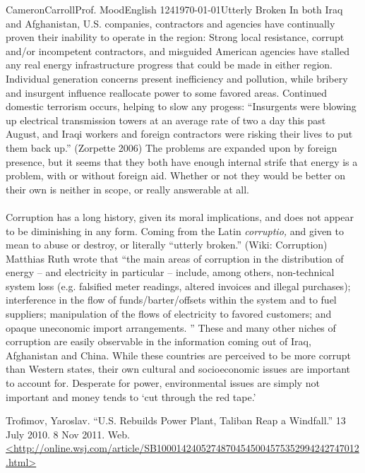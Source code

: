 \begin{mla}{Cameron}{Carroll}{Prof. Mood}{English 124}{\today}{Utterly Broken}
In both Iraq and Afghanistan, U.S. companies, contractors and agencies have continually proven their inability to operate in the region: Strong local resistance, corrupt and/or incompetent contractors, and misguided American agencies have stalled any real energy infrastructure progress that could be made in either region. Individual generation concerns present inefficiency and pollution, while bribery and insurgent influence reallocate power to some favored areas. Continued domestic terrorism occurs, helping to slow any progess: ``Insurgents were blowing up electrical transmission towers at an average rate of two a day this past August, and Iraqi workers and foreign contractors were risking their lives to put them back up.'' (Zorpette 2006) The problems are expanded upon by foreign presence, but it seems that they both have enough internal strife that energy is a problem, with or without foreign aid. Whether or not they would be better on their own is neither in scope, or really answerable at all.

\paragraph{} 
Corruption has a long history, given its moral implications, and does not appear to be diminishing in any form. Coming from the Latin \emph{corruptio,} and given to mean to abuse or destroy, or literally ``utterly broken.'' (Wiki: Corruption) Matthias Ruth wrote that ``the main areas of corruption in the distribution of energy – and electricity in particular – include, among others, non-technical system loss (e.g. falsified meter readings, altered invoices and illegal purchases); interference in the flow of funds/barter/offsets within the system and to fuel suppliers; manipulation of the flows of electricity to favored customers; and opaque uneconomic import arrangements. '' These and many other niches of corruption are easily observable in the information coming out of Iraq, Afghanistan and China. While these countries are perceived to be more corrupt than Western states, their own cultural and socioeconomic issues are important to account for. Desperate for power, environmental issues are simply not important and money tends to `cut through the red tape.'



\begin{workscited}

\bibent
Trofimov, Yaroslav. ``U.S. Rebuilds Power Plant, Taliban Reap a Windfall.'' 13 July 2010. 8 Nov 2011. Web. \url{<http://online.wsj.com/article/SB10001424052748704545004575352994242747012.html>}


\end{workscited}
\end{mla}
